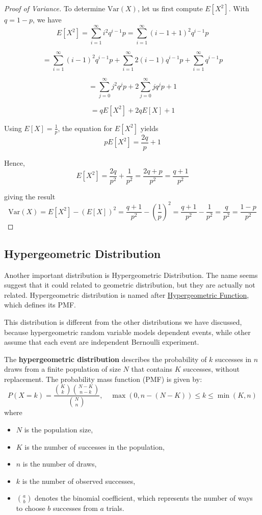 \begin{proof}[Proof of Variance]
    To determine \(\text{Var}(X)\), let us first compute \(E[X^2]\). With \( q = 1 - p \), we have
\[
E[X^2] = \sum_{i=1}^{\infty} i^2 q^{i-1} p= \sum_{i=1}^{\infty} (i - 1 + 1)^2 q^{i-1} p
\]

\[
= \sum_{i=1}^{\infty} (i - 1)^2 q^{i-1} p + \sum_{i=1}^{\infty} 2(i - 1) q^{i-1} p + \sum_{i=1}^{\infty} q^{i-1} p
\]

\[
= \sum_{j=0}^{\infty} j^2 q^j p + 2 \sum_{j=0}^{\infty} j q^j p + 1
\]

\[
= q E[X^2] + 2q E[X] + 1
\]

Using \(E[X] = \frac{1}{p}\), the equation for \(E[X^2]\) yields
\[
p E[X^2] = \frac{2q}{p} + 1
\]

Hence,
\[
E[X^2] = \frac{2q}{p^2} + \frac{1}{p^2} = \frac{2q + p}{p^2} = \frac{q + 1}{p^2}
\]

giving the result
\[
\text{Var}(X) = E[X^2] - (E[X])^2 = \frac{q + 1}{p^2} - \left(\frac{1}{p}\right)^2 = \frac{q + 1}{p^2} - \frac{1}{p^2} = \frac{q}{p^2} = \frac{1 - p}{p^2}
\]
\end{proof}
\subsection{Hypergeometric Distribution}
Another important distribution is Hypergeometric Distribution. The name seems suggest that it could related to geometric distribution, but they are actually not related. Hypergeometric distribution is named after \href{https://www.wikiwand.com/en/Hypergeometric_function}{Hypergeometric Function}, which defines its PMF.

This distribution is different from the other distributions we have discussed, because hypergeometric random variable models dependent events, while other assume that each event are independent Bernoulli experiment.

\begin{definition}
The \textbf{hypergeometric distribution} describes the probability of \( k \) successes in \( n \) draws from a finite population of size \( N \) that contains \( K \) successes, without replacement. The probability mass function (PMF) is given by:
\[
P(X = k) = \frac{\binom{K}{k} \binom{N-K}{n-k}}{\binom{N}{n}}, \quad \max(0, n - (N - K)) \leq k \leq \min(K, n)
\]
where
\begin{itemize}
    \item \( N \) is the population size,
    \item \( K \) is the number of successes in the population,
    \item \( n \) is the number of draws,
    \item \( k \) is the number of observed successes,
    \item \(\binom{a}{b}\) denotes the binomial coefficient, which represents the number of ways to choose \( b \) successes from \( a \) trials.
\end{itemize}
\end{definition}

